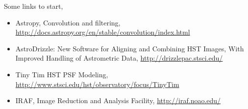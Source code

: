 \documentclass[11pt,fleqn]{book} %
\begin{document}
																																																																																																																																																																																																														    \begin{remark}
																																																																																																																																																																																																														    	Some links to start,
																																																																																																																																																																																																															    \begin{itemize}
																																																																																																																																																																																																															        	\item Astropy, Convolution and filtering, \url{http://docs.astropy.org/en/stable/convolution/index.html}
																																																																																																																																																																																																																	        \item AstroDrizzle: New Software for Aligning and Combining
																																																																																																																																																																																																																		HST Images, With Improved Handling of Astrometric Data, \url{http://drizzlepac.stsci.edu/}
																																																																																																																																																																																																																				\item Tiny Tim HST PSF Modeling, \url{http://www.stsci.edu/hst/observatory/focus/TinyTim}
																																																																																																																																																																																																																				        \item IRAF, Image Reduction and Analysis Facility, \url{http://iraf.noao.edu/}
																																																																																																																																																																																																																					    \end{itemize}
																																																																																																																																																																																																																					    \end{remark}
\end{document}
